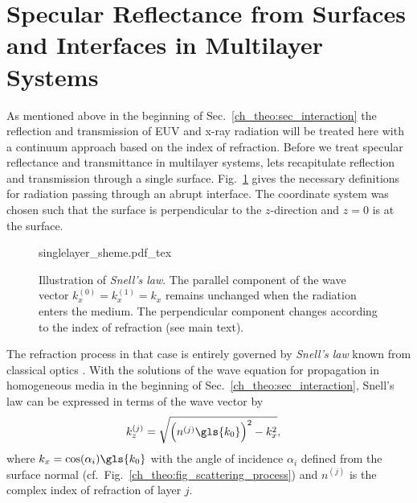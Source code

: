 \section{Specular Reflectance from Surfaces and Interfaces in Multilayer Systems}
As mentioned above in the beginning of Sec.~\ref{ch_theo:sec_interaction} the reflection and transmission of EUV and x-ray radiation will be treated here with a continuum approach based on the index of refraction. Before we treat specular reflectance and transmittance in multilayer systems, lets recapitulate reflection and transmission through a single surface. Fig.~\ref{ch_theo:fig_singlelayer_scheme} gives the necessary definitions for radiation passing through an abrupt interface. The coordinate system was chosen such that the surface is perpendicular to the $z$-direction and $z=0$ is at the surface.
\begin{figure}[htb]
    \def\svgwidth{0.57\textwidth}
    {singlelayer_sheme.pdf_tex}
    \caption{Illustration of \emph{Snell's law}. The parallel component of the wave vector $k_x^{(0)} = k_x^{(1)} = k_x$ remains unchanged when the radiation enters the medium. The perpendicular component changes according to the index of refraction (see main text).}
    \label{ch_theo:fig_singlelayer_scheme}
\end{figure}
The refraction process in that case is entirely governed by \emph{Snell's law} known from classical optics \cite{born_principles_1965}. With the solutions of the wave equation for propagation in homogeneous media in the beginning of Sec.~\ref{ch_theo:sec_interaction}, Snell's law can be expressed in terms of the wave vector by
\begin{align}
k_z^{(j)} &= \sqrt{\Big(n^{(j)} \gls{k_0}\Big)^2 - k_x^2} \text{,} \label{ch_theo:eqn_snells_law}
\end{align}
where $k_x = \cos(\alpha_i) \gls{k_0}$ with the angle of incidence $\alpha_i$ defined from the surface normal (cf.~Fig.~\ref{ch_theo:fig_scattering_process}) and $n^{(j)}$ is the complex index of refraction of layer $j$.

